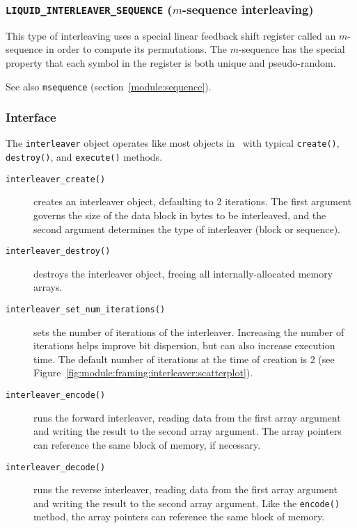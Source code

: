 
\subsubsection{{\tt LIQUID\_INTERLEAVER\_SEQUENCE} ($m$-sequence interleaving)}
\label{module:framing:interleaver:sequence}
This type of interleaving uses a special linear feedback shift register called
an $m$-sequence in order to compute its permutations.
The $m$-sequence has the special property that each symbol in the register is
both unique and pseudo-random.


See also {\tt msequence} (section~\ref{module:sequence}).

\subsubsection{Interface}
\label{module:framing:interleaver:interface}
The {\tt interleaver} object operates like most objects in \liquid\ with
typical {\tt create()}, {\tt destroy()}, and {\tt execute()} methods.

\begin{description}
\item[{\tt interleaver\_create()}]
    creates an interleaver object, defaulting to 2 iterations.
    The first argument governs the size of the data block in bytes to be
    interleaved, and the second argument determines the type of interleaver
    (block or sequence).
\item[{\tt interleaver\_destroy()}]
    destroys the interleaver object, freeing all internally-allocated memory
    arrays.
\item[{\tt interleaver\_set\_num\_iterations()}]
    sets the number of iterations of the interleaver.
    Increasing the number of iterations helps improve bit dispersion, but can
    also increase execution time.
    The default number of iterations at the time of creation is 2 (see
    Figure~\ref{fig:module:framing:interleaver:scatterplot}).
\item[{\tt interleaver\_encode()}]
    runs the forward interleaver, reading data from the first array argument
    and writing the result to the second array argument.
    The array pointers can reference the same block of memory, if necessary.
\item[{\tt interleaver\_decode()}]
    runs the reverse interleaver, reading data from the first array argument
    and writing the result to the second array argument.
    Like the {\tt encode()} method, the array pointers can reference the same
    block of memory.
\end{description}

